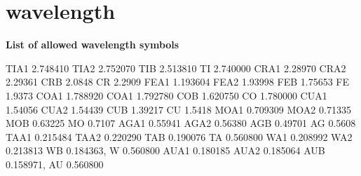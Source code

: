 \section{wavelength}
{\bf List of allowed wavelength symbols \par }
\par
\begin{MacVerbatim}
TIA1   2.748410    TIA2   2.752070     TIB    2.513810     TI     2.740000
CRA1   2.28970     CRA2   2.29361      CRB    2.0848       CR     2.2909
FEA1   1.193604    FEA2   1.93998      FEB    1.75653      FE     1.9373
COA1   1.788920    COA1   1.792780     COB    1.620750     CO     1.780000
CUA1   1.54056     CUA2   1.54439      CUB    1.39217      CU     1.5418
MOA1   0.709309    MOA2   0.71335      MOB    0.63225      MO     0.7107
AGA1   0.55941     AGA2   0.56380      AGB    0.49701      AG     0.5608
TAA1   0.215484    TAA2   0.220290     TAB    0.190076     TA     0.560800
WA1    0.208992    WA2    0.213813     WB     0.184363,    W      0.560800
AUA1   0.180185    AUA2   0.185064     AUB    0.158971,    AU     0.560800
\end{MacVerbatim}
